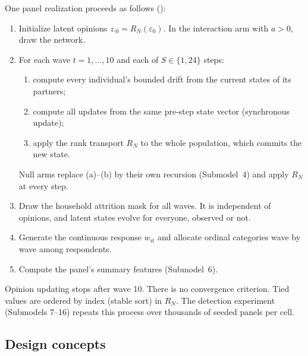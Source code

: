 One panel realization proceeds as follows ():
\begin{enumerate}
\item Initialize latent opinions $z_{\cdot0}=R_N(\varepsilon_0)$. In the interaction arm with $a>0$, draw the network.
\item For each wave $t=1,\ldots,10$ and each of $S\in\{1,24\}$ steps:
  \begin{enumerate}
  \item compute every individual's bounded drift from the current states of its partners;
  \item compute all updates from the same pre-step state vector (synchronous update);
  \item apply the rank transport $R_N$ to the whole population, which commits the new state.
  \end{enumerate}
  Null arms replace (a)--(b) by their own recursion (Submodel~4) and apply $R_N$ at every step.
\item Draw the household attrition mask for all waves. It is independent of opinions, and latent states evolve for everyone, observed or not.
\item Generate the continuous response $w_{it}$ and allocate ordinal categories wave by wave among respondents.
\item Compute the panel's summary features (Submodel~6).
\end{enumerate}
Opinion updating stops after wave 10. There is no convergence criterion. Tied values are ordered by index (stable sort) in $R_N$. The detection experiment (Submodels 7--16) repeats this process over thousands of seeded panels per cell.

\subsection{Design concepts}

